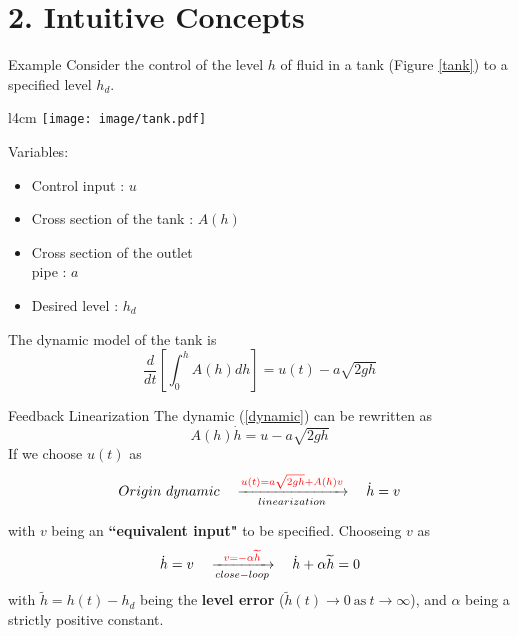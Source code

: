 \documentclass{beamer}
\begin{document}
  \section{2. Intuitive Concepts}

  \begin{frame}{Example}
    Consider the control of the level $h$ of fluid in a tank (Figure \ref{tank}) to a specified level $h_{d}$.

    \begin{wrapfigure}{l}{4cm}
    \vspace{-10pt}
    \texttt{[image: image/tank.pdf]}\\
    \vspace{-15pt}
    \caption{Fluid level control in a tank}\label{tank}
    \vspace{-10pt}
    \end{wrapfigure}

    Variables:
    \begin{itemize}
      \item Control input : $u$
      \item Cross section of the tank : $A(h)$
      \item Cross section of the outlet \\ pipe : $a$
      \item Desired level : $h_{d}$
    \end{itemize}

    The dynamic model of the tank is
    \begin{equation}\label{dynamic}
      \frac{d}{dt}\left[\int_{0}^{h}A(h)dh\right] = u(t) - a \sqrt{2gh}
    \end{equation}

  \end{frame}


  \begin{frame}{Feedback Linearization}
  The dynamic (\ref{dynamic}) can be rewritten as
  $$ A(h)\dot{h} = u-a\sqrt{2gh} $$
  If we choose $u(t)$ as
  $$ 
  Origin~dynamic \quad \xrightarrow[linearization]{{\color{red} u(t) = a\sqrt{2gh} + A(h)v}} \quad \dot{h}=v
  $$

  with $v$ being an \textbf{``equivalent input"} to be specified.
  Chooseing $v$ as
  $$
   \dot{h}=v \quad \xrightarrow[close-loop]{{\color{red} v=-\alpha \widetilde{h}}} \quad \dot{h}+\alpha \widetilde{h}=0
  $$
  with $\widetilde{h} = h(t)-h_{d}$ being the \textbf{level error} ($\widetilde{h}(t)\rightarrow 0 ~\text{as}~ t \rightarrow \infty$), and $\alpha$ being a strictly positive constant.
  \end{frame}
\end{document}

